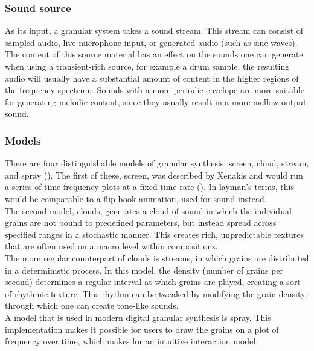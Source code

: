 \documentclass[10pt, twocolumn]{IEEEtran}
\begin{document}
\subsubsection{Sound source}
As its input, a granular system takes a sound stream. This stream can consist of sampled audio, live microphone input, or generated audio (such as sine waves). The content of this source material has an effect on the sounds one can generate: when using a transient-rich source, for example a drum sample, the resulting audio will usually have a substantial amount of content in the higher regions of the frequency spectrum. Sounds with a more periodic envelope are more suitable for generating melodic content, since they usually result in a more mellow output sound.\\

\subsubsection{Models}
There are four distinguishable models of granular synthesis: screen, cloud, stream, and spray (\cite{roads12}). The first of these, screen, was described by Xenakis and would run a series of time-frequency plots at a fixed time rate (\cite{xenakis63}). In layman's terms, this would be comparable to a flip book animation, used for sound instead. \\
The second model, clouds, generates a cloud of sound in which the individual grains are not bound to predefined parameters, but instead spread across specified ranges in a stochastic manner. This creates rich, unpredictable textures that are often used on a macro level within compositions. \\
The more regular counterpart of clouds is streams, in which grains are distributed in a deterministic process. In this model, the density (number of grains per second) determines a regular interval at which grains are played, creating a sort of rhythmic texture. This rhythm can be tweaked by modifying the grain density, through which one can create tone-like sounds. \\
A model that is used in modern digital granular synthesis is spray. This implementation makes it possible for users to draw the grains on a plot of frequency over time, which makes for an intuitive interaction model.\\
\end{document}

